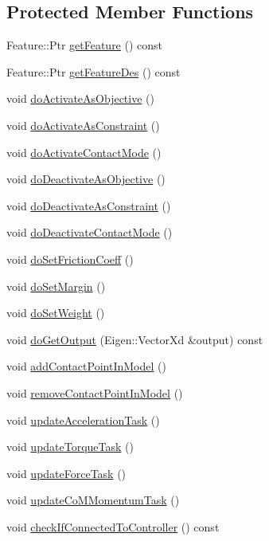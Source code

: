 \subsection*{Protected Member Functions}
\begin{DoxyCompactItemize}
\item 
Feature\+::\+Ptr \hyperlink{classocra_1_1Task_a3b37400c1d279be73c415c148265efad}{get\+Feature} () const 
\item 
Feature\+::\+Ptr \hyperlink{classocra_1_1Task_a2ed66e1d5ba638318792d024a63f3cc4}{get\+Feature\+Des} () const 
\item 
void \hyperlink{classocra_1_1Task_ac5b5ad719f9a34bdc0a275804b4c50f3}{do\+Activate\+As\+Objective} ()
\item 
void \hyperlink{classocra_1_1Task_ae1d786b51c24d56c4e2d800e422ebc75}{do\+Activate\+As\+Constraint} ()
\item 
void \hyperlink{classocra_1_1Task_acbee7ddb69459ff0d2e450dbe6195b49}{do\+Activate\+Contact\+Mode} ()
\item 
void \hyperlink{classocra_1_1Task_af2874b0d97d3fb735dc5a49c0f80a717}{do\+Deactivate\+As\+Objective} ()
\item 
void \hyperlink{classocra_1_1Task_a9f7261991e6aa056a02ec7f3dd4ea72a}{do\+Deactivate\+As\+Constraint} ()
\item 
void \hyperlink{classocra_1_1Task_a98cfb17f9df4e27b5c1d9cc2bf0faa9e}{do\+Deactivate\+Contact\+Mode} ()
\item 
void \hyperlink{classocra_1_1Task_a575fdd8324142d60096bcb4e41b70d6a}{do\+Set\+Friction\+Coeff} ()
\item 
void \hyperlink{classocra_1_1Task_a3c7c2460b3e60764349fe5ad331e41d6}{do\+Set\+Margin} ()
\item 
void \hyperlink{classocra_1_1Task_a9a2c1a965f429ec5a3a756e8a1aeff37}{do\+Set\+Weight} ()
\item 
void \hyperlink{classocra_1_1Task_ae64f52ad24db6f8b811b38302c51c373}{do\+Get\+Output} (Eigen\+::\+Vector\+Xd \&output) const 
\item 
void \hyperlink{classocra_1_1Task_ad09f069ad2649ebe9eb2d51f49b2c531}{add\+Contact\+Point\+In\+Model} ()
\item 
void \hyperlink{classocra_1_1Task_a5dc76ab144162dd2960999c19510033f}{remove\+Contact\+Point\+In\+Model} ()
\item 
void \hyperlink{classocra_1_1Task_a3660b0a6149ae5472d00dab4f2799dfc}{update\+Acceleration\+Task} ()
\item 
void \hyperlink{classocra_1_1Task_a484d8cb46cd388b065b5d9cd03fa4caa}{update\+Torque\+Task} ()
\item 
void \hyperlink{classocra_1_1Task_a49af52acac5f23a6fc51c071271ae6ea}{update\+Force\+Task} ()
\item 
void \hyperlink{classocra_1_1Task_a2cfddc40424cb0edd08defe5df48addf}{update\+Co\+M\+Momentum\+Task} ()
\item 
void \hyperlink{classocra_1_1Task_a9ebee5d2eb1b78850441c3d006751220}{check\+If\+Connected\+To\+Controller} () const 
\end{DoxyCompactItemize}


